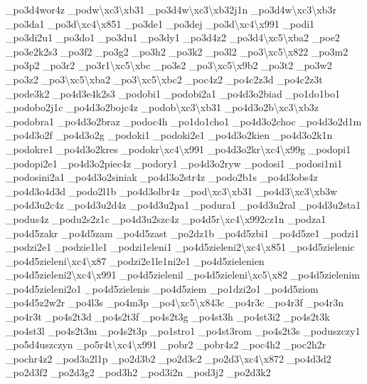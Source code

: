 \begin{DoxyCompactItemize}
\-\_\-po3d4wor4z \-\_\-podw\textbackslash{}xc3\textbackslash{}xb31 \-\_\-po3d4w\textbackslash{}xc3\textbackslash{}xb32j1n \-\_\-po3d4w\textbackslash{}xc3\textbackslash{}xb3r \-\_\-po3da1 \-\_\-po3d\textbackslash{}xc4\textbackslash{}x851 \-\_\-po3de1 \-\_\-po3dej \-\_\-po3d\textbackslash{}xc4\textbackslash{}x991 \-\_\-podi1 \-\_\-po3di2u1 \-\_\-po3do1 \-\_\-po3du1 \-\_\-po3dy1 \-\_\-po3d4z2 \-\_\-po3d4\textbackslash{}xc5\textbackslash{}xba2 \-\_\-poe2 \-\_\-po3e2k2s3 \-\_\-po3f2 \-\_\-po3g2 \-\_\-po3h2 \-\_\-po3k2 \-\_\-po3l2 \-\_\-po3\textbackslash{}xc5\textbackslash{}x822 \-\_\-po3m2 \-\_\-po3p2 \-\_\-po3r2 \-\_\-po3r1\textbackslash{}xc5\textbackslash{}xbc \-\_\-po3s2 \-\_\-po3\textbackslash{}xc5\textbackslash{}x9b2 \-\_\-po3t2 \-\_\-po3w2 \-\_\-po3z2 \-\_\-po3\textbackslash{}xc5\textbackslash{}xba2 \-\_\-po3\textbackslash{}xc5\textbackslash{}xbc2 \-\_\-poc4z2 \-\_\-po4c2z3d \-\_\-po4c2z3t \-\_\-pode3k2 \-\_\-po4d3e4k2s3 \-\_\-podobi1 \-\_\-podobi2a1 \-\_\-po4d3o2biad \-\_\-po1do1bo1 \-\_\-podobo2j1c \-\_\-po4d3o2bojc4z \-\_\-podob\textbackslash{}xc3\textbackslash{}xb31 \-\_\-po4d3o2b\textbackslash{}xc3\textbackslash{}xb3z \-\_\-podobra1 \-\_\-po4d3o2braz \-\_\-podoc4h \-\_\-po1do1cho1 \-\_\-po4d3o2choc \-\_\-po4d3o2d1m \-\_\-po4d3o2f \-\_\-po4d3o2g \-\_\-podoki1 \-\_\-podoki2e1 \-\_\-po4d3o2kien \-\_\-po4d3o2k1n \-\_\-podokre1 \-\_\-po4d3o2kres \-\_\-podokr\textbackslash{}xc4\textbackslash{}x991 \-\_\-po4d3o2kr\textbackslash{}xc4\textbackslash{}x99g \-\_\-podopi1 \-\_\-podopi2e1 \-\_\-po4d3o2piec4z \-\_\-podory1 \-\_\-po4d3o2ryw \-\_\-podosi1 \-\_\-podosi1ni1 \-\_\-podosini2a1 \-\_\-po4d3o2siniak \-\_\-po4d3o2str4z \-\_\-podo2b1s \-\_\-po4d3obs4z \-\_\-po4d3o4d3d \-\_\-podo2l1b \-\_\-po4d3olbr4z \-\_\-pod\textbackslash{}xc3\textbackslash{}xb31 \-\_\-po4d3\textbackslash{}xc3\textbackslash{}xb3w \-\_\-po4d3u2c4z \-\_\-po4d3u2d4z \-\_\-po4d3u2pa1 \-\_\-podura1 \-\_\-po4d3u2ral \-\_\-po4d3u2sta1 \-\_\-podus4z \-\_\-podu2s2z1c \-\_\-po4d3u2szc4z \-\_\-po4d5r\textbackslash{}xc4\textbackslash{}x992cz1n \-\_\-podza1 \-\_\-po4d5zakr \-\_\-po4d5zam \-\_\-po4d5zast \-\_\-po2dz1b \-\_\-po4d5zbi1 \-\_\-po4d5ze1 \-\_\-podzi1 \-\_\-podzi2e1 \-\_\-podzie1le1 \-\_\-podzi1eleni1 \-\_\-po4d5zieleni2\textbackslash{}xc4\textbackslash{}x851 \-\_\-po4d5zielenic \-\_\-po4d5zieleni\textbackslash{}xc4\textbackslash{}x87 \-\_\-podzi2e1le1ni2e1 \-\_\-po4d5zielenien \-\_\-po4d5zieleni2\textbackslash{}xc4\textbackslash{}x991 \-\_\-po4d5zielenil \-\_\-po4d5zieleni\textbackslash{}xc5\textbackslash{}x82 \-\_\-po4d5zielenim \-\_\-po4d5zieleni2o1 \-\_\-po4d5zielenis \-\_\-po4d5ziem \-\_\-po1dzi2o1 \-\_\-po4d5ziom \-\_\-po4d5z2w2r \-\_\-po4l3s \-\_\-po4m3p \-\_\-po4\textbackslash{}xc5\textbackslash{}x843c \-\_\-po4r3c \-\_\-po4r3f \-\_\-po4r3n \-\_\-po4r3t \-\_\-po4s2t3d \-\_\-po4s2t3f \-\_\-po4s2t3g \-\_\-po4st3h \-\_\-po4st3i2 \-\_\-po4s2t3k \-\_\-po4st3l \-\_\-po4s2t3m \-\_\-po4s2t3p \-\_\-po1stro1 \-\_\-po4st3rom \-\_\-po4s2t3s \-\_\-poduszczy1 \-\_\-po5d4uszczyn \-\_\-po5r4t\textbackslash{}xc4\textbackslash{}x991 \-\_\-pobr2 \-\_\-pobr4z2 \-\_\-poc4h2 \-\_\-poc2h2r \-\_\-pochr4z2 \-\_\-pod3a2l1p \-\_\-po2d3b2 \-\_\-po2d3c2 \-\_\-po2d3\textbackslash{}xc4\textbackslash{}x872 \-\_\-po4d3d2 \-\_\-po2d3f2 \-\_\-po2d3g2 \-\_\-pod3h2 \-\_\-pod3i2n \-\_\-pod3j2 \-\_\-po2d3k2 
\end{DoxyCompactItemize}
